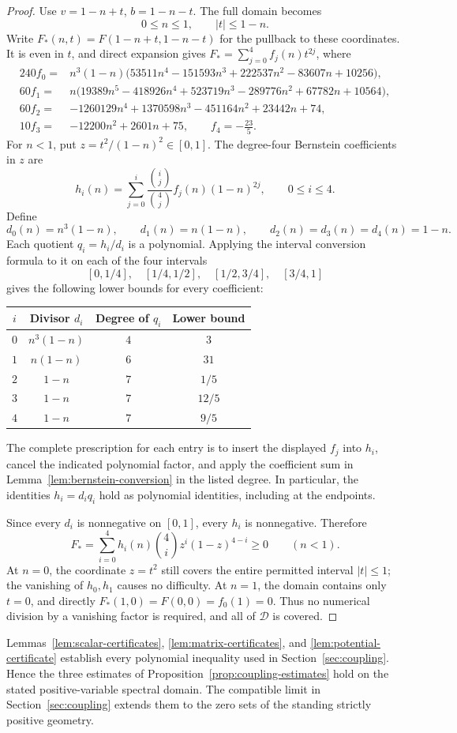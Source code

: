 \begin{proof}
Use $v=1-n+t$, $b=1-n-t$. The full domain becomes
\[
 0\le n\le1,\qquad |t|\le1-n.
\]
Write $F_*(n,t)=F(1-n+t,1-n-t)$ for the pullback to these coordinates.
It is even in $t$, and direct expansion gives
$F_*=\sum_{j=0}^4 f_j(n)t^{2j}$, where
\[
\begin{aligned}
 240f_0={}&n^3(1-n)\bigl(53511n^4-151593n^3
                 +222537n^2-83607n+10256\bigr),\\
 60f_1={}&n\bigl(19389n^5-418926n^4+523719n^3
                 -289776n^2+67782n+10564\bigr),\\
 60f_2={}&-1260129n^4+1370598n^3-451164n^2+23442n+74,\\
 10f_3={}&-12200n^2+2601n+75,\qquad
 f_4=-\frac{23}{5}.
\end{aligned}
\]
For $n<1$, put $z=t^2/(1-n)^2\in[0,1]$. The degree-four Bernstein
coefficients in $z$ are
\[
 h_i(n)=\sum_{j=0}^i
       \frac{\binom ij}{\binom4j}f_j(n)(1-n)^{2j},
 \qquad 0\le i\le4.
\]
Define
\[
 d_0(n)=n^3(1-n),\qquad d_1(n)=n(1-n),\qquad
 d_2(n)=d_3(n)=d_4(n)=1-n.
\]
Each quotient $q_i=h_i/d_i$ is a polynomial. Applying the interval
conversion formula to it on each of the four intervals
\[
 [0,1/4],\quad[1/4,1/2],\quad[1/2,3/4],\quad[3/4,1]
\]
gives the following lower bounds for every coefficient:
\begin{center}
\begin{tabular}{@{}cccc@{}}
\toprule
$i$ & Divisor $d_i$ & Degree of $q_i$ & Lower bound\\
\midrule
$0$ & $n^3(1-n)$ & $4$ & $3$\\
$1$ & $n(1-n)$ & $6$ & $31$\\
$2$ & $1-n$ & $7$ & $1/5$\\
$3$ & $1-n$ & $7$ & $12/5$\\
$4$ & $1-n$ & $7$ & $9/5$\\
\bottomrule
\end{tabular}
\end{center}
The complete prescription for each entry is to insert the displayed
$f_j$ into $h_i$, cancel the indicated polynomial factor, and apply
the coefficient sum in Lemma~\ref{lem:bernstein-conversion} in the
listed degree. In particular, the identities $h_i=d_iq_i$ hold as
polynomial identities, including at the endpoints.

Since every $d_i$ is nonnegative on $[0,1]$, every $h_i$ is
nonnegative. Therefore
\[
 F_*=\sum_{i=0}^4h_i(n)\binom4i z^i(1-z)^{4-i}\ge0
 \qquad(n<1).
\]
At $n=0$, the coordinate $z=t^2$ still covers the entire permitted
interval $|t|\le1$; the vanishing of $h_0,h_1$ causes no difficulty.
At $n=1$, the domain contains only $t=0$, and directly
$F_*(1,0)=F(0,0)=f_0(1)=0$. Thus no numerical division by a vanishing factor
is required, and all of $\mathcal D$ is covered.
\end{proof}

Lemmas~\ref{lem:scalar-certificates}, \ref{lem:matrix-certificates},
and \ref{lem:potential-certificate} establish every polynomial
inequality used in Section~\ref{sec:coupling}. Hence the three estimates
of Proposition~\ref{prop:coupling-estimates} hold on the stated
positive-variable spectral domain. The compatible limit in
Section~\ref{sec:coupling} extends them to the zero sets of the standing
strictly positive geometry.
